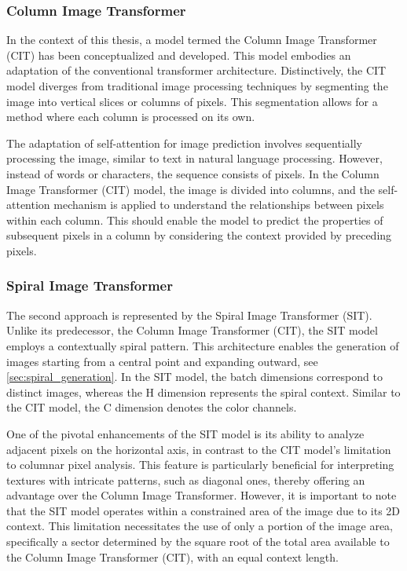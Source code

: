     \subsubsection{Column Image Transformer}
    \label{sec:IntroColumnModel}

    In the context of this thesis, a model termed the Column Image Transformer (CIT) has been conceptualized and developed. This model embodies an adaptation of the conventional transformer architecture. Distinctively, the CIT model diverges from traditional image processing techniques by segmenting the image into vertical slices or columns of pixels. This segmentation allows for a method where each column is processed on its own.

    The adaptation of self-attention for image prediction involves sequentially processing the image, similar to text in natural language processing. However, instead of words or characters, the sequence consists of pixels. In the Column Image Transformer (CIT) model, the image is divided into columns, and the self-attention mechanism is applied to understand the relationships between pixels within each column. This should enable the model to predict the properties of subsequent pixels in a column by considering the context provided by preceding pixels.

    \subsubsection{Spiral Image Transformer}
    \label{sec:IntroSpiralModel}

    The second approach is represented by the Spiral Image Transformer (SIT). Unlike its predecessor, the Column Image Transformer (CIT), the SIT model employs a contextually spiral pattern. This architecture enables the generation of images starting from a central point and expanding outward, see \autoref{sec:spiral_generation}. In the SIT model, the batch dimensions correspond to distinct images, whereas the H dimension represents the spiral context. Similar to the CIT model, the C dimension denotes the color channels.

    One of the pivotal enhancements of the SIT model is its ability to analyze adjacent pixels on the horizontal axis, in contrast to the CIT model's limitation to columnar pixel analysis. This feature is particularly beneficial for interpreting textures with intricate patterns, such as diagonal ones, thereby offering an advantage over the Column Image Transformer. However, it is important to note that the SIT model operates within a constrained area of the image due to its 2D context. This limitation necessitates the use of only a portion of the image area, specifically a sector determined by the square root of the total area available to the Column Image Transformer (CIT), with an equal context length.
    
